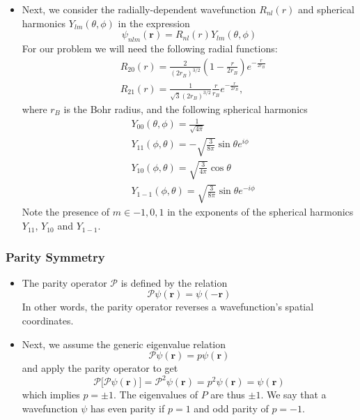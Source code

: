 \documentclass[11pt, a4paper]{article}
\renewcommand{\vec}[1]{\bm{#1}} %
\newcommand{\p}{\psi}  %
\renewcommand{\r}{\vec{r}}  %
\renewcommand{\P}{\mathcal{P}}  %
\begin{document}
\begin{itemize}
	\item Next, we consider the radially-dependent wavefunction $ R_{nl}(r) $ and spherical harmonics $ Y_{lm}(\theta, \phi) $ in the expression
	\begin{equation*}
		\p_{nlm}(\r) = R_{nl}(r) Y_{lm}(\theta, \phi)
	\end{equation*}
	For our problem we will need the following radial functions:
	\begin{align*}
		& R_{20}(r) = \frac{2}{(2r_{B})^{3/2}}\left(1 - \frac{r}{2r_{B}}\right)e^{-\frac{r}{2r_{B}}}\\
		& R_{21}(r) = \frac{1}{\sqrt{3}(2r_{B})^{3/2}}\frac{r}{r_{B}}e^{-\frac{r}{2r_{B}}},
	\end{align*}
	where $ r_{B} $ is the Bohr radius, and the following spherical harmonics
	\begin{align*}
		& Y_{00}(\theta, \phi) = \frac{1}{\sqrt{4\pi}}	\\
		& Y_{11}(\phi, \theta) = - \sqrt{\frac{3}{8\pi}}\sin \theta e^{i \phi}	\\
		& Y_{10}(\phi, \theta) = \sqrt{\frac{3}{4\pi}}\cos \theta	\\
		& Y_{1-1}(\phi, \theta)	 = \sqrt{\frac{3}{8\pi}}\sin \theta e^{-i\phi}
	\end{align*}
	Note the presence of $ m \in {-1, 0, 1} $ in the exponents of the spherical harmonics $ Y_{11} $, $ Y_{10} $ and $ Y_{1-1} $.
\end{itemize}


\subsubsection{Parity Symmetry}
\begin{itemize}
	\item The parity operator $ \P $ is defined by the relation
	\begin{equation*}
		\P \p(\r) = \p(-\r)
	\end{equation*}
	In other words, the parity operator reverses a wavefunction's spatial coordinates. 
	
	\item Next, we assume the generic eigenvalue relation
	\begin{equation*}
		\P\p(\r) = p \p(\r)
	\end{equation*}
	and apply the parity operator to get
	\begin{equation*}
		\P \big[\P\p(\r)\big] = \P^{2}\p(\r) = p^{2} \p(\r) = \p(\r)
	\end{equation*}
	which implies $ p = \pm 1 $. The eigenvalues of $ P $ are thus $ \pm 1 $. We say that a wavefunction $ \p $ has even parity if $ p = 1 $ and odd parity of $ p = - 1 $. 
\end{itemize}
\end{document}
